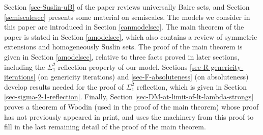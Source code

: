 \documentclass[fleqn, 11pt]{amsart}
\theoremstyle{plain}
\theoremstyle{definition}
\theoremstyle{remark}
\newcommand{\AD}{\mathsf{AD}}
\begin{document}
Section \ref{sec-Suslin-uB} of the paper reviews universally Baire sets, and Section \ref{semiscalesec} presents some material on semiscales. The models we consider in this paper are introduced in Section \ref{canmodelsec}. The main theorem of the paper is stated in Section \ref{amodelsec}, which also contains a review of symmetric extensions and homogeneously Suslin sets. The proof of the main theorem is given in Section \ref{amodelsec}, relative to three facts proved in later sections, including the  $\Sigma^{2}_{1}$-reflection property of our model. Sections \ref{sec-R-genericity-iterations} (on genericity iterations) and \ref{sec-F-absoluteness} (on absoluteness) develop results needed for the proof of $\Sigma^{2}_{1}$ reflection, which is given in Section \ref{sec-sigma-2-1-reflection}. Finally, Section \ref{sec-DM-at-limit-of-lt-lambda-strongs} proves a theorem of Woodin (used in the proof of the main theorem) whose proof has not previously appeared in print, and uses the machinery from this proof to fill in the last remaining detail of the proof of the main theorem. 


\end{document}
